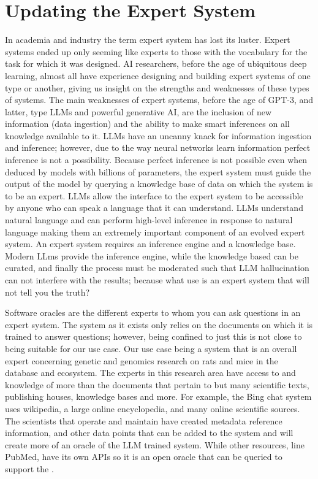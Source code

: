 \section{Updating the Expert System}
In academia and industry the term expert system has lost its luster.
Expert systems ended up only seeming like experts to those with the vocabulary for the task for which it was designed.
AI researchers, before the age of ubiquitous deep learning, almost all have experience designing and building expert systems of one type or another, giving us insight on the strengths and weaknesses of these types of systems.
The main weaknesses of expert systems, before the age of GPT-3, and latter, type LLMs and powerful generative AI, are the inclusion of new information (data ingestion) and the ability to make smart inferences on all knowledge available to it.
LLMs have an uncanny knack for information ingestion and inference; however, due to the way neural networks learn information perfect inference is not a possibility.
Because perfect inference is not possible even when deduced by models with billions of parameters, the expert system must guide the output of the model by querying a knowledge base of data on which the system is to be an expert.
LLMs allow the interface to the expert system to be accessible by anyone who can speak a language that it can understand.
LLMs understand natural language and can perform high-level inference in response to natural language making them an extremely important component of an evolved expert system.
An expert system requires an inference engine and a knowledge base.
Modern LLms provide the inference engine, while the knowledge based can be curated, and finally the process must be moderated such that LLM hallucination can not interfere with the results; because what use is an expert system that will not tell you the truth?

Software oracles are the different experts to whom you can ask questions in an expert system.
The system as it exists only relies on the documents on which it is trained to answer questions; however, being confined to just this is not close to being suitable for our use case.
Our use case being a system that is an overall expert concerning genetic and genomics research on rats and mice in the \GN database and ecosystem.
The experts in this research area have access to and knowledge of more than the documents that pertain to \GN but many scientific texts, publishing houses, knowledge bases and more.
For example, the Bing chat system uses wikipedia, a large online encyclopedia, and many online scientific sources.
The scientists that operate and maintain \GN have created metadata reference information, and other data points that can be added to the system and will create more of an oracle of the LLM trained system.
While other resources, line PubMed, have its own APIs so it is an open oracle that can be queried to support the \project.

